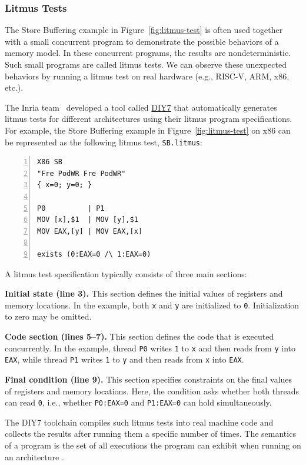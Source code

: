 \subsubsection{Litmus Tests}
\label{sec:litmus-tests}

The Store Buffering example in Figure~\ref{fig:litmus-test} is often used together with a small concurrent program to demonstrate the possible behaviors of a memory model. In these concurrent programs, the results are nondeterministic. Such small programs are called litmus tests. We can observe these unexpected behaviors by running a litmus test on real hardware (e.g., RISC-V, ARM, x86, etc.).

The Inria team~\citep{10.1145/2627752} developed a tool called \href{https://diy.inria.fr/}{DIY7} that automatically generates litmus tests for different architectures using their litmus program specifications. For example, the Store Buffering example in Figure~\ref{fig:litmus-test} on x86 can be represented as the following litmus test, \texttt{SB.litmus}:

\begin{lstlisting}[numbers=left, xleftmargin=2em]
X86 SB
"Fre PodWR Fre PodWR"
{ x=0; y=0; }

P0          | P1
MOV [x],$1  | MOV [y],$1
MOV EAX,[y] | MOV EAX,[x]

exists (0:EAX=0 /\ 1:EAX=0)
\end{lstlisting}

A litmus test specification typically consists of three main sections:

\textbf{Initial state (line 3).} This section defines the initial values of registers and memory locations. In the example, both \texttt{x} and \texttt{y} are initialized to \texttt{0}. Initialization to zero may be omitted.

\textbf{Code section (lines 5--7).} This section defines the code that is executed concurrently. In the example, thread \texttt{P0} writes \texttt{1} to \texttt{x} and then reads from \texttt{y} into \texttt{EAX}, while thread \texttt{P1} writes \texttt{1} to \texttt{y} and then reads from \texttt{x} into \texttt{EAX}.

\textbf{Final condition (line 9).} This section specifies constraints on the final values of registers and memory locations. Here, the condition asks whether both threads can read \texttt{0}, i.e., whether \texttt{P0:EAX=0} and \texttt{P1:EAX=0} can hold simultaneously.

The DIY7 toolchain compiles such litmus tests into real machine code and collects the results after running them a specific number of times. The semantics of a program is the set of all executions the program can exhibit when running on an architecture \citep{DennisPhdThesis}.

